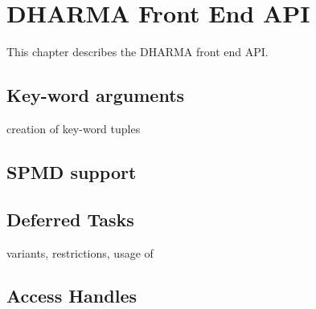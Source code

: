 \chapter{DHARMA Front End API}
\label{chap:front_end}
This chapter describes the DHARMA \gls{front end} \gls{API}. 

\section{Key-word arguments}
\label{sec:key-word}

creation of key-word tuples


\section{SPMD support}
\label{sec:spmd}





\section{Deferred Tasks}
\label{sec:deferred}

variants, restrictions, usage of 


\section{Access Handles}
\label{sec:handles}








